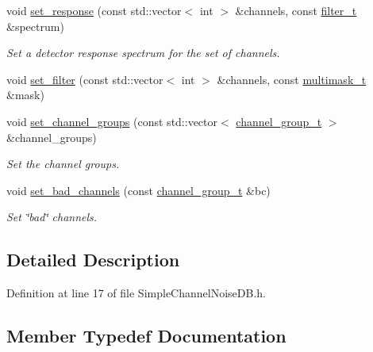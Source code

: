\begin{DoxyCompactItemize}
\item 
void \hyperlink{class_wire_cell_1_1_sig_proc_1_1_simple_channel_noise_d_b_ae5a4c212b9589940124fcce6075f8996}{set\+\_\+response} (const std\+::vector$<$ int $>$ \&channels, const \hyperlink{class_wire_cell_1_1_i_channel_noise_database_a0acbae29743542eb1c652f7a56e692f5}{filter\+\_\+t} \&spectrum)
\begin{DoxyCompactList}\small\item\em Set a detector response spectrum for the set of channels. \end{DoxyCompactList}\item 
void \hyperlink{class_wire_cell_1_1_sig_proc_1_1_simple_channel_noise_d_b_a6c9fc361d1a4b92415cb41ff2ee33ae4}{set\+\_\+filter} (const std\+::vector$<$ int $>$ \&channels, const \hyperlink{class_wire_cell_1_1_sig_proc_1_1_simple_channel_noise_d_b_ac88af8d617681e36c68c5f1899452d01}{multimask\+\_\+t} \&mask)
\item 
void \hyperlink{class_wire_cell_1_1_sig_proc_1_1_simple_channel_noise_d_b_a01fd459a5a0234366f78b5eeee61c599}{set\+\_\+channel\+\_\+groups} (const std\+::vector$<$ \hyperlink{class_wire_cell_1_1_i_channel_noise_database_a7fedd6ab67ba4e7eeb8cf182cc9dc6b1}{channel\+\_\+group\+\_\+t} $>$ \&channel\+\_\+groups)
\begin{DoxyCompactList}\small\item\em Set the channel groups. \end{DoxyCompactList}\item 
void \hyperlink{class_wire_cell_1_1_sig_proc_1_1_simple_channel_noise_d_b_ad6dc8bcaab51091165b9c1a43e47f8eb}{set\+\_\+bad\+\_\+channels} (const \hyperlink{class_wire_cell_1_1_i_channel_noise_database_a7fedd6ab67ba4e7eeb8cf182cc9dc6b1}{channel\+\_\+group\+\_\+t} \&bc)
\begin{DoxyCompactList}\small\item\em Set \char`\"{}bad\char`\"{} channels. \end{DoxyCompactList}\end{DoxyCompactItemize}


\subsection{Detailed Description}


Definition at line 17 of file Simple\+Channel\+Noise\+D\+B.\+h.



\subsection{Member Typedef Documentation}
\mbox{\label{class_wire_cell_1_1_sig_proc_1_1_simple_channel_noise_d_b_a4b7e8bae65910a6667ee80bfde4cc77d}} 
